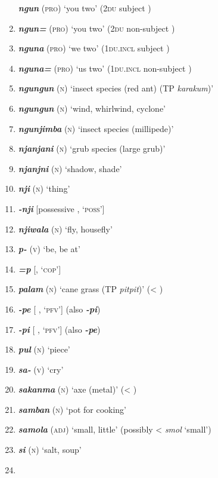 \begin{enumerate}[noitemsep, label={}, align=left, widest=190, labelsep=1ex,leftmargin=*,itemindent=-10pt]
\textbf{\textit{ngun}} (\textsc{pro}) ‘you two’ (2\textsc{du} subject ) \item
\textbf{\textit{ngun=}} (\textsc{pro)} ‘you two’ (2\textsc{du} non-subject ) \item
\textbf{\textit{nguna}} (\textsc{pro}) ‘we two’ (1\textsc{du.incl} subject ) \item
\textbf{\textit{nguna=}} (\textsc{pro}) ‘us two’ (1\textsc{du.incl} non-subject ) \item
\textbf{\textit{ngungun}} (\textsc{n}) ‘insect species (red ant) (TP \textit{karakum})’ \item
\textbf{\textit{ngungun}} (\textsc{n}) ‘wind, whirlwind, cyclone’ \item
\textbf{\textit{ngunjimba}} (\textsc{n}) ‘insect species (millipede)’ \item
\textbf{\textit{njanjani}} (\textsc{n}) ‘grub species (large grub)’ \item
\textbf{\textit{njanjni}} (\textsc{n}) ‘shadow, shade’ \item
\textbf{\textit{nji}} (\textsc{n}) ‘thing’ \item
\textbf{\textit{-nji}} [possessive , ‘\textsc{poss}’] \item
\textbf{\textit{njiwala}} (\textsc{n}) ‘fly, housefly’ \item
\textbf{\textit{p-}} (\textsc{v}) ‘be, be at’ \item
\textbf{\textit{=p}} [, \textsc{‘cop’}] \item
\textbf{\textit{palam}} (\textsc{n}) ‘cane grass (TP \textit{pitpit})’ (< ) \item
\textbf{\textit{-pe}} [ , ‘\textsc{pfv}’] (also \textbf{\textit{-pi}}) \item
\textbf{\textit{-pi} }[ , ‘\textsc{pfv}’] (also \textbf{\textit{-pe}}) \item
\textbf{\textit{pul}} (\textsc{n}) ‘piece’ \item
\textbf{\textit{sa-}} (\textsc{v}) ‘cry’ \item
\textbf{\textit{sakanma}} (\textsc{n}) ‘axe (metal)’ (< ) \item
\textbf{\textit{samban}} (\textsc{n}) ‘pot for cooking’ \item
\textbf{\textit{samola}} (\textsc{adj}) ‘small, little’ (possibly <  \textit{smol} ‘small’) \item
\textbf{\textit{si}} (\textsc{n}) ‘salt, soup’ \item

\end{enumerate}
